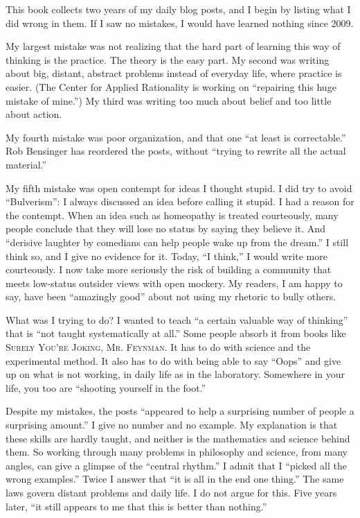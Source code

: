 
This book collects two years of my daily blog posts, and I begin by listing what I did wrong in them. If I saw no mistakes, I would have learned nothing since 2009.

My largest mistake was not realizing that the hard part of learning this way of thinking is the practice. The theory is the easy part. My second was writing about big, distant, abstract problems instead of everyday life, where practice is easier. (The Center for Applied Rationality is working on ``repairing this huge mistake of mine.'') My third was writing too much about belief and too little about action.

My fourth mistake was poor organization, and that one ``at least is correctable.'' Rob Bensinger has reordered the posts, without ``trying to rewrite all the actual material.'' 

My fifth mistake was open contempt for ideas I thought stupid. I did try to avoid ``Bulverism'': I always discussed an idea before calling it stupid.  I had a reason for the contempt. When an idea such as homeopathy is treated courteously, many people conclude that they will lose no status by saying they believe it. And ``derisive laughter by comedians can help people wake up from the dream.'' I still think so, and I give no evidence for it. Today, ``I think,'' I would write more courteously. I now take more seriously the risk of building a community that meets low-status outsider views with open mockery. My readers, I am happy to say, have been ``amazingly good'' about not using my rhetoric to bully others.

What was I trying to do? I wanted to teach ``a certain valuable way of thinking'' that is ``not taught systematically at all.'' Some people absorb it from books like \textsc{Surely You're Joking, Mr. Feynman}.  It has to do with science and the experimental method. It also has to do with being able to say ``Oops'' and give up on what is not working, in daily life as in the laboratory. Somewhere in your life, you too are ``shooting yourself in the foot.''

Despite my mistakes, the posts ``appeared to help a surprising number of people a surprising amount.'' I give no number and no example. My explanation is that these skills are hardly taught, and neither is the mathematics and science behind them. So working through many problems in philosophy and science, from many angles, can give a glimpse of the ``central rhythm.'' I admit that I ``picked all the wrong examples.'' Twice I answer that ``it is all in the end one thing.'' The same laws govern distant problems and daily life. I do not argue for this. Five years later, ``it still appears to me that this is better than nothing.''

